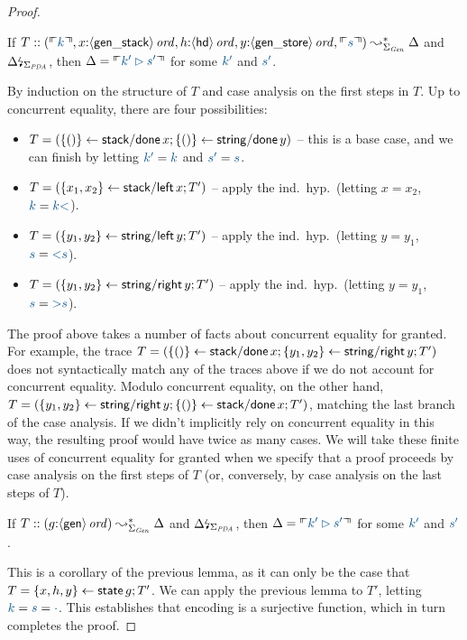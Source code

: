 \begin{proof}
\begin{lemma} If 
$T :: (\ctxinterp{k}, 
       x{:}\istrue{\susp{\sf gen\_stack}}, 
       h{:}\istrue{\susp{\sf hd}},
       y{:}\istrue{\susp{\sf gen\_store}},
       \ctxinterp{s}) 
  \leadsto^*_{\Sigma_{\it Gen}} \Delta$ and
${\Delta}{\mbox{\lightning}}_{\Sigma_{\it
      PDA}}$, then $\Delta = \ctxinterp{k' \rhd s'}$ for some $\obj{k'}$
and $\obj{s'}$.
\end{lemma}
\noindent
By induction on the structure of $T$ and case analysis on the 
first steps in $T$. Up to concurrent equality, there
are four possibilities:
\smallskip
\begin{itemize}
\item $T = (\{{()}\} \leftarrow {{\sf stack/done}\,x}; \{{()}\} \leftarrow {{\sf
      string/done}\,y})$ -- this is a base case, and we can finish by
  letting $\obj{k'} = \obj{k}$ and $\obj{s'} = \obj{s}$.
\item $T = (\{{x_1,x_2}\} \leftarrow {{\sf stack/left}\,x}; T')$ -- apply 
  the ind.~hyp.~(letting $x = x_2$, $\obj{k} =
  \obj{k{\sf <}}$).
\item $T = (\{{y_1,y_2}\} \leftarrow {{\sf string/left}\,y}; T')$ -- apply
  the ind.~hyp.~(letting $y = y_1$, $\obj{s} =
  \obj{{\sf <}s}$).
\item $T = (\{{y_1,y_2}\} \leftarrow {{\sf string/right}\,y}; T')$ -- apply
  the ind.~hyp.~(letting $y = y_1$, $\obj{s} =
  \obj{{\sf >}s}$).
\end{itemize}
\smallskip 
The proof above takes
a number of facts about concurrent equality for granted. 
%
For example, the trace $T = (\{{()}\} \leftarrow {{\sf stack/done}\,x};
\{{y_1,y_2}\} \leftarrow {{\sf string/right}\,y}; T')$ does not syntactically
match any of the traces above if we do not account for concurrent
equality. Modulo concurrent equality, on the other hand, $T =
(\{{y_1,y_2}\} \leftarrow {{\sf string/right}\,y}; \{{()}\} \leftarrow {{\sf
    stack/done}\,x}; T')$, matching the last branch of the case
analysis.  If we didn't implicitly rely on concurrent equality in this
way, the resulting proof would have twice as many cases.  We will take
these finite uses of concurrent equality for granted when we specify
that a proof proceeds by case analysis on the first steps of $T$ (or,
conversely, by case analysis on the last steps of $T$).

\begin{lemma} If 
$T :: (g{:}{\langle {\sf gen} \rangle}\,{{\it ord}}) 
  \leadsto^*_{\Sigma_{\it Gen}} \Delta$ and
${\Delta}{\mbox{\lightning}}_{\Sigma_{\it
      PDA}}$, then $\Delta = \ctxinterp{k' \rhd s'}$ for some $\obj{k'}$
and $\obj{s'}$.
\end{lemma}
\noindent
This is a corollary of the previous lemma, as it can only
be the case that $T = \{{x,h,y}\} \leftarrow {{\sf state}\,g}; T'$. We can apply the previous
lemma to $T'$, letting $\obj{k} = \obj{s} = \obj{\cdot}$.
This establishes that encoding is a surjective function, which in turn
completes the proof. 
\end{proof}

